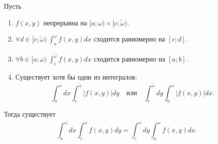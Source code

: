 \begin{theorem}
    Пусть
    \begin{enumerate}
        \item $ f(x,y) $ непрерывна на $ [a;\omega)\times[c;\widetilde{\omega}) $.
        \item $ \forall d \in [c;\widetilde{\omega}) \ \int_{a}^{\omega}f(x,y)dx $ сходится равномерно на $ [c;d] $.
        \item $ \forall b \in [a;\omega) \ \int_{c}^{\widetilde{\omega}}f(x,y)dx $ сходится равномерно на $ [a;b] $.
        \item Существует хотя бы одни из интегралов:
              \[
                  \int_{a}^{\omega}dx \int_{c}^{\widetilde{\omega}}\big|f(x,y)\big|dy \quad \text{или}\quad \int_{c}^{\widetilde{\omega}}dy \int_{a}^{\omega}\big|f(x,y)\big|dx.
              \]
    \end{enumerate}

    Тогда существует
    \[
        \int_{a}^{\omega}dx \int_{c}^{\widetilde{\omega}}f(x,y)dy=\int_{c}^{\widetilde{\omega}}dy \int_{a}^{\omega}f(x,y)dx.
    \]
\end{theorem}

